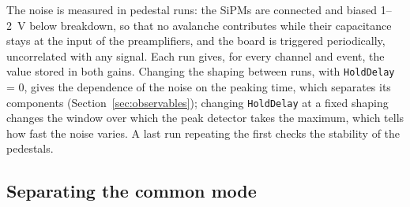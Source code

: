 \documentclass[11pt,a4paper]{article}
\begin{document}
The noise is measured in pedestal runs: the SiPMs are connected and biased 1--2~V below
breakdown, so that no avalanche contributes while their capacitance stays at the input of the
preamplifiers, and the board is triggered periodically, uncorrelated with any signal. Each run
gives, for every channel and event, the value stored in both gains. Changing the shaping
between runs, with \texttt{HoldDelay} = 0, gives the dependence of the noise on the peaking
time, which separates its components (Section~\ref{sec:observables}); changing
\texttt{HoldDelay} at a fixed shaping changes the window over which the peak detector takes the
maximum, which tells how fast the noise varies. A last run repeating the first checks the
stability of the pedestals.

\subsection{Separating the common mode}
\label{sec:cm}
\end{document}
